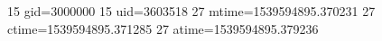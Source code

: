 15 gid=3000000
15 uid=3603518
27 mtime=1539594895.370231
27 ctime=1539594895.371285
27 atime=1539594895.379236
